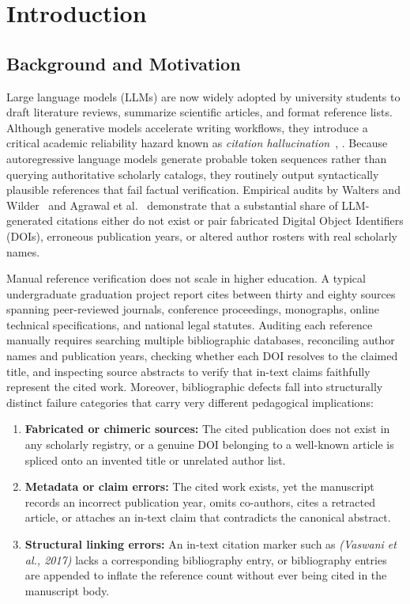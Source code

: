 \chapter{Introduction}
\label{chap:introduction}

\section{Background and Motivation}

Large language models (LLMs) are now widely adopted by university students to draft literature reviews, summarize scientific articles, and format reference lists. Although generative models accelerate writing workflows, they introduce a critical academic reliability hazard known as \emph{citation hallucination}~\cite{Ji2023}, \cite{huang2025hallucination}. Because autoregressive language models generate probable token sequences rather than querying authoritative scholarly catalogs, they routinely output syntactically plausible references that fail factual verification. Empirical audits by Walters and Wilder~\cite{walters2023fabrication} and Agrawal et al.~\cite{agrawal2024hallucinating} demonstrate that a substantial share of LLM-generated citations either do not exist or pair fabricated Digital Object Identifiers (DOIs), erroneous publication years, or altered author rosters with real scholarly names.

Manual reference verification does not scale in higher education. A typical undergraduate graduation project report cites between thirty and eighty sources spanning peer-reviewed journals, conference proceedings, monographs, online technical specifications, and national legal statutes. Auditing each reference manually requires searching multiple bibliographic databases, reconciling author names and publication years, checking whether each DOI resolves to the claimed title, and inspecting source abstracts to verify that in-text claims faithfully represent the cited work. Moreover, bibliographic defects fall into structurally distinct failure categories that carry very different pedagogical implications:
\begin{enumerate}
    \item \textbf{Fabricated or chimeric sources:} The cited publication does not exist in any scholarly registry, or a genuine DOI belonging to a well-known article is spliced onto an invented title or unrelated author list.
    \item \textbf{Metadata or claim errors:} The cited work exists, yet the manuscript records an incorrect publication year, omits co-authors, cites a retracted article, or attaches an in-text claim that contradicts the canonical abstract.
    \item \textbf{Structural linking errors:} An in-text citation marker such as \textit{(Vaswani et al., 2017)} lacks a corresponding bibliography entry, or bibliography entries are appended to inflate the reference count without ever being cited in the manuscript body.
\end{enumerate}

